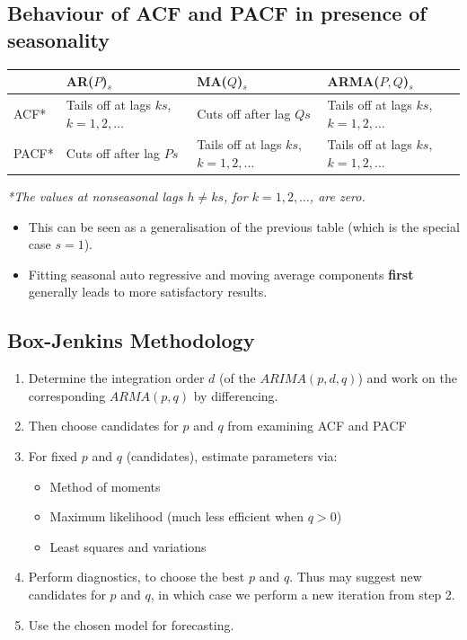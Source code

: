 \documentclass[11pt]{article}
\begin{document}
\subsection{Behaviour of ACF and PACF in presence of seasonality}
\begin{table}[ht]
\centering
\renewcommand{\arraystretch}{1.2}
\begin{tabularx}{\textwidth}{lX X X}
\toprule
 & AR($P$)$_s$ & MA($Q$)$_s$ & ARMA($P, Q$)$_s$ \\
\midrule
ACF*  & Tails off at lags $ks$, $k=1,2,\ldots$ 
      & Cuts off after lag $Qs$ 
      & Tails off at lags $ks$, $k=1,2,\ldots$ \\

PACF* & Cuts off after lag $Ps$ 
      & Tails off at lags $ks$, $k=1,2,\ldots$ 
      & Tails off at lags $ks$, $k=1,2,\ldots$ \\
\bottomrule
\end{tabularx}
\end{table}

\vspace{0.5em}
\noindent
\textit{*The values at nonseasonal lags $h \ne ks$, for $k = 1, 2, \ldots$, are zero.}

\vspace{1em}

\begin{itemize}[leftmargin=*]
  \item This can be seen as a generalisation of the previous table (which is the special case $s=1$).
  \item Fitting seasonal auto regressive and moving average components \textbf{first} generally leads to more satisfactory results.
\end{itemize}

\subsection{Box-Jenkins Methodology}
\begin{enumerate}
    \item Determine the integration order $d$ (of the $ARIMA(p, d, q)$) and work on the corresponding $ARMA(p, q)$ by differencing.
    \item Then choose candidates for $p$ and $q$ from examining ACF and PACF
    \item For fixed $p$ and $q$ (candidates), estimate parameters via:
        \begin{itemize}
            \item Method of moments
            \item Maximum likelihood (much less efficient when $q > 0$)
            \item Least squares and variations
        \end{itemize}
    \item Perform diagnostics, to choose the best $p$ and $q$. Thus may suggest new candidates for $p$ and $q$, in which case we perform a new iteration from step 2.
    \item Use the chosen model for forecasting.
\end{enumerate} \phantom{i}
\end{document}
